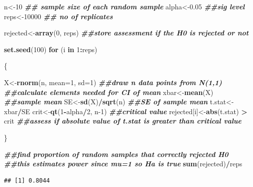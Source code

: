 \documentclass[
]{book}
\newenvironment{Shaded}{\begin{snugshade}}{\end{snugshade}}
\newcommand{\AttributeTok}[1]{\textcolor[rgb]{0.13,0.29,0.53}{#1}}
\newcommand{\ControlFlowTok}[1]{\textcolor[rgb]{0.13,0.29,0.53}{\textbf{#1}}}
\newcommand{\DecValTok}[1]{\textcolor[rgb]{0.00,0.00,0.81}{#1}}
\newcommand{\DocumentationTok}[1]{\textcolor[rgb]{0.56,0.35,0.01}{\textbf{\textit{#1}}}}
\newcommand{\FloatTok}[1]{\textcolor[rgb]{0.00,0.00,0.81}{#1}}
\newcommand{\FunctionTok}[1]{\textcolor[rgb]{0.13,0.29,0.53}{\textbf{#1}}}
\newcommand{\NormalTok}[1]{#1}
\newcommand{\OtherTok}[1]{\textcolor[rgb]{0.56,0.35,0.01}{#1}}
\newcommand{\SpecialCharTok}[1]{\textcolor[rgb]{0.81,0.36,0.00}{\textbf{#1}}}
\begin{document}
\begin{Shaded}
\begin{Highlighting}[]
\NormalTok{n}\OtherTok{\textless{}{-}}\DecValTok{10} \DocumentationTok{\#\# sample size of each random sample}
\NormalTok{alpha}\OtherTok{\textless{}{-}}\FloatTok{0.05} \DocumentationTok{\#\#sig level}
\NormalTok{reps}\OtherTok{\textless{}{-}}\DecValTok{10000} \DocumentationTok{\#\# no of replicates}

\NormalTok{rejected}\OtherTok{\textless{}{-}}\FunctionTok{array}\NormalTok{(}\DecValTok{0}\NormalTok{, reps) }\DocumentationTok{\#\#store assessment if the H0 is rejected or not}

\FunctionTok{set.seed}\NormalTok{(}\DecValTok{100}\NormalTok{)}
\ControlFlowTok{for}\NormalTok{ (i }\ControlFlowTok{in} \DecValTok{1}\SpecialCharTok{:}\NormalTok{reps)}
  
\NormalTok{\{}
  
\NormalTok{  X}\OtherTok{\textless{}{-}}\FunctionTok{rnorm}\NormalTok{(n, }\AttributeTok{mean=}\DecValTok{1}\NormalTok{, }\AttributeTok{sd=}\DecValTok{1}\NormalTok{) }\DocumentationTok{\#\#draw n data points from N(1,1)}
  \DocumentationTok{\#\#calculate elements needed for CI of mean}
\NormalTok{  xbar}\OtherTok{\textless{}{-}}\FunctionTok{mean}\NormalTok{(X) }\DocumentationTok{\#\#sample mean}
\NormalTok{  SE}\OtherTok{\textless{}{-}}\FunctionTok{sd}\NormalTok{(X)}\SpecialCharTok{/}\FunctionTok{sqrt}\NormalTok{(n) }\DocumentationTok{\#\#SE of sample mean}
\NormalTok{  t.stat}\OtherTok{\textless{}{-}}\NormalTok{xbar}\SpecialCharTok{/}\NormalTok{SE}
\NormalTok{  crit}\OtherTok{\textless{}{-}}\FunctionTok{qt}\NormalTok{(}\DecValTok{1}\SpecialCharTok{{-}}\NormalTok{alpha}\SpecialCharTok{/}\DecValTok{2}\NormalTok{, n}\DecValTok{{-}1}\NormalTok{) }\DocumentationTok{\#\#critical value}
\NormalTok{  rejected[i]}\OtherTok{\textless{}{-}}\FunctionTok{abs}\NormalTok{(t.stat) }\SpecialCharTok{\textgreater{}}\NormalTok{ crit }\DocumentationTok{\#\#assess if absolute value of t.stat is greater than critical value}
  
\NormalTok{\}}

\DocumentationTok{\#\#find proportion of random samples that correctly rejected H0}
\DocumentationTok{\#\#this estimates power since mu=1 so Ha is true}
\FunctionTok{sum}\NormalTok{(rejected)}\SpecialCharTok{/}\NormalTok{reps }
\end{Highlighting}
\end{Shaded}

\begin{verbatim}
## [1] 0.8044
\end{verbatim}
\end{document}
